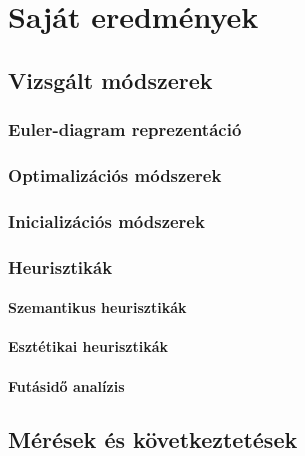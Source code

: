 

\cleardoublepage
\chapter{Saját eredmények}
\section{Vizsgált módszerek}

\subsection{Euler-diagram reprezentáció} %
\subsection{Optimalizációs módszerek}
\subsection{Inicializációs módszerek}


\subsection{Heurisztikák} %
\subsubsection{Szemantikus heurisztikák}
\subsubsection{Esztétikai heurisztikák}
\subsubsection{Futásidő analízis}



\section{Mérések és következtetések} %

